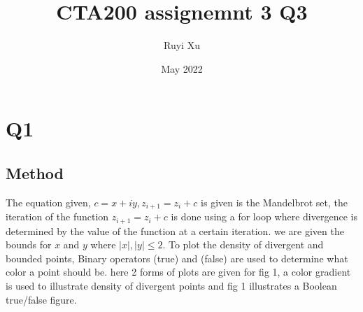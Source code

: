 \documentclass{article}
\title{CTA200 assignemnt 3 Q3}
\author{Ruyi Xu }
\date{May 2022}
\begin{document}
\maketitle
\newpage
\section{Q1}
\subsection{Method}
The equation given, $c=x+iy, z_{i+1} = z_{i}+c$ is given is the Mandelbrot set, the iteration of the function $z_{i+1} = z_{i}+c$ is done using a for loop where divergence is determined by the value of the function at a certain iteration. we are given the bounds for $x$ and $y$ where $|x|,|y|\leq 2$. To plot the density of divergent and bounded points, Binary operators (true) and (false) are used to determine what color a point should be. here 2 forms of plots are given for fig 1, a color gradient is used to illustrate density of divergent points and fig 1 illustrates a Boolean true/false figure.\\
\end{document}
